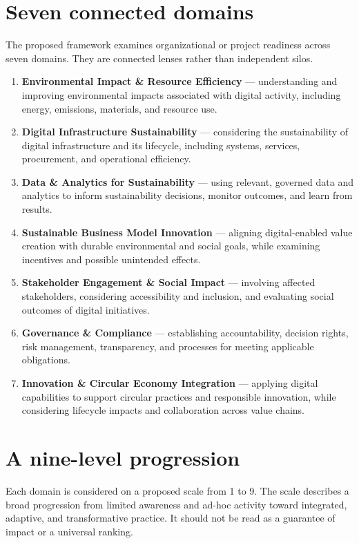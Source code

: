 \documentclass[11pt,a4paper]{article}
\begin{document}
\section*{Seven connected domains}
The proposed framework examines organizational or project readiness across seven domains. They are connected lenses rather than independent silos.
\begin{enumerate}
  \item \textbf{Environmental Impact \& Resource Efficiency} — understanding and improving environmental impacts associated with digital activity, including energy, emissions, materials, and resource use.
  \item \textbf{Digital Infrastructure Sustainability} — considering the sustainability of digital infrastructure and its lifecycle, including systems, services, procurement, and operational efficiency.
  \item \textbf{Data \& Analytics for Sustainability} — using relevant, governed data and analytics to inform sustainability decisions, monitor outcomes, and learn from results.
  \item \textbf{Sustainable Business Model Innovation} — aligning digital-enabled value creation with durable environmental and social goals, while examining incentives and possible unintended effects.
  \item \textbf{Stakeholder Engagement \& Social Impact} — involving affected stakeholders, considering accessibility and inclusion, and evaluating social outcomes of digital initiatives.
  \item \textbf{Governance \& Compliance} — establishing accountability, decision rights, risk management, transparency, and processes for meeting applicable obligations.
  \item \textbf{Innovation \& Circular Economy Integration} — applying digital capabilities to support circular practices and responsible innovation, while considering lifecycle impacts and collaboration across value chains.
\end{enumerate}

\section*{A nine-level progression}
Each domain is considered on a proposed scale from 1 to 9. The scale describes a broad progression from limited awareness and ad-hoc activity toward integrated, adaptive, and transformative practice. It should not be read as a guarantee of impact or a universal ranking.
\end{document}
